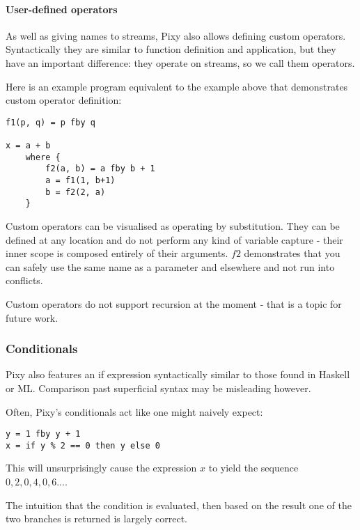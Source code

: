 \documentclass{scrartcl}
\begin{document}
    \paragraph{User-defined operators}
    
    As well as giving names to streams, Pixy also allows defining custom operators. Syntactically they are similar to function definition and application, but they have an important difference: they operate on streams, so we call them operators.
    
    Here is an example program equivalent to the example above that demonstrates custom operator definition:
    
    \begin{lstlisting}
f1(p, q) = p fby q

x = a + b
    where {
        f2(a, b) = a fby b + 1
        a = f1(1, b+1)
        b = f2(2, a)
    }
    \end{lstlisting}
    
    Custom operators can be visualised as operating by substitution. They can be defined at any location and do not perform any kind of variable capture - their inner scope is composed entirely of their arguments. $f2$ demonstrates that you can safely use the same name as a parameter and elsewhere and not run into conflicts.
    
    Custom operators do not support recursion at the moment - that is a topic for future work.
    
    \subsubsection{Conditionals}
    
    Pixy also features an if expression syntactically similar to those found in Haskell or ML. Comparison past superficial syntax may be misleading however.
    
    Often, Pixy's conditionals act like one might naively expect:
    
    \begin{lstlisting}
y = 1 fby y + 1
x = if y % 2 == 0 then y else 0
    \end{lstlisting}
    
    This will unsurprisingly cause the expression $x$ to yield the sequence $0, 2, 0, 4, 0, 6 ...$.
    
    The intuition that the condition is evaluated, then based on the result one of the two branches is returned is largely correct.
    
\end{document}
